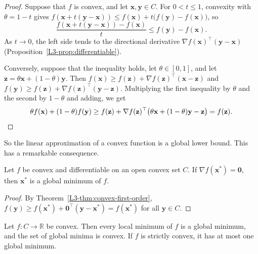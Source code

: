 \begin{proof}
    Suppose that $f$ is convex, and let $\mathbf{x}, \mathbf{y} \in C$. For $0 < t \leq 1$, convexity with $\theta = 1 - t$ gives $f(\mathbf{x} + t(\mathbf{y} - \mathbf{x})) \leq f(\mathbf{x}) + t\big(f(\mathbf{y}) - f(\mathbf{x})\big)$, so
    \[\frac{f(\mathbf{x} + t(\mathbf{y} - \mathbf{x})) - f(\mathbf{x})}{t} \leq f(\mathbf{y}) - f(\mathbf{x}).\]
    As $t \to 0$, the left side tends to the directional derivative $\nabla f(\mathbf{x})^\top(\mathbf{y} - \mathbf{x})$ (Proposition~\ref{L3-prop:differentiable}).

    Conversely, suppose that the inequality holds, let $\theta \in [0, 1]$, and let $\mathbf{z} = \theta\mathbf{x} + (1 - \theta)\mathbf{y}$. Then $f(\mathbf{x}) \geq f(\mathbf{z}) + \nabla f(\mathbf{z})^\top(\mathbf{x} - \mathbf{z})$ and $f(\mathbf{y}) \geq f(\mathbf{z}) + \nabla f(\mathbf{z})^\top(\mathbf{y} - \mathbf{z})$. Multiplying the first inequality by $\theta$ and the second by $1 - \theta$ and adding, we get
    \[\theta f(\mathbf{x}) + (1 - \theta)f(\mathbf{y}) \geq f(\mathbf{z}) + \nabla f(\mathbf{z})^\top\big(\theta\mathbf{x} + (1 - \theta)\mathbf{y} - \mathbf{z}\big) = f(\mathbf{z}).\qedhere\]
\end{proof}

So the linear approximation of a convex function is a global lower bound. This has a remarkable consequence.

\begin{corollary}\label{L3-cor:convex-global}
    Let $f$ be convex and differentiable on an open convex set $C$. If $\nabla f(\mathbf{x}^*) = \mathbf{0}$, then $\mathbf{x}^*$ is a global minimum of $f$.
\end{corollary}

\begin{proof}
    By Theorem~\ref{L3-thm:convex-first-order}, $f(\mathbf{y}) \geq f(\mathbf{x}^*) + \mathbf{0}^\top(\mathbf{y} - \mathbf{x}^*) = f(\mathbf{x}^*)$ for all $\mathbf{y} \in C$.
\end{proof}

\begin{proposition}\label{L3-prop:convex-minima}
    Let $f: C \to \mathbb{R}$ be convex. Then every local minimum of $f$ is a global minimum, and the set of global minima is convex. If $f$ is strictly convex, it has at most one global minimum.
\end{proposition}

